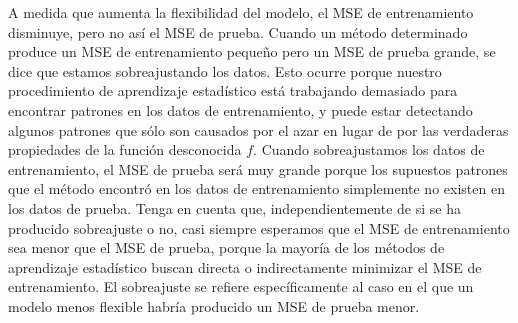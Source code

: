 A medida que aumenta la flexibilidad del modelo, el MSE de entrenamiento disminuye, pero no así el MSE de prueba. Cuando un método determinado produce un MSE de entrenamiento pequeño pero un MSE de prueba grande, se dice que estamos sobreajustando los datos. Esto ocurre porque nuestro procedimiento de aprendizaje estadístico está trabajando demasiado para encontrar patrones en los datos de entrenamiento, y puede estar detectando algunos patrones que sólo son causados por el azar en lugar de por las verdaderas propiedades de la función desconocida $f$. Cuando sobreajustamos los datos de entrenamiento, el MSE de prueba será muy grande porque los supuestos patrones que el método encontró en los datos de entrenamiento simplemente no existen en los datos de prueba. Tenga en cuenta que, independientemente de si se ha producido sobreajuste o no, casi siempre esperamos que el MSE de entrenamiento sea menor que el MSE de prueba, porque la mayoría de los métodos de aprendizaje estadístico buscan directa o indirectamente minimizar el MSE de entrenamiento. El sobreajuste se refiere específicamente al caso en el que un modelo menos flexible habría producido un MSE de prueba menor.


